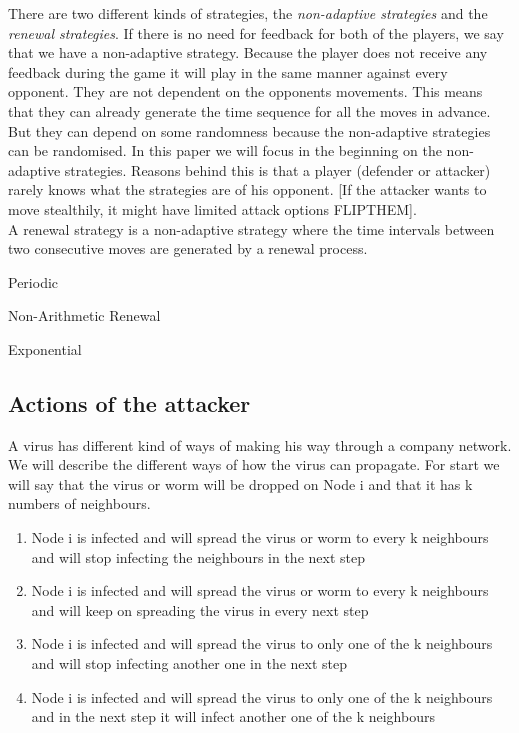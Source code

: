 There are two different kinds of strategies, the \textit{non-adaptive strategies} and the \textit{renewal strategies}. If there is no need for feedback for both of the players, we say that we have a non-adaptive strategy. Because the player does not receive any feedback during the game it will play in the same manner against every opponent. They are not dependent on the opponents movements. This means that they can already generate the time sequence for all the moves in advance.  But they can depend on some randomness because the non-adaptive strategies can be randomised. 
In this paper we will focus in the beginning on the non-adaptive strategies. Reasons behind this is that a player (defender or attacker) rarely knows what the strategies are of his opponent. [If the attacker wants to move stealthily, it might have limited attack options FLIPTHEM]. \\
A renewal strategy is a non-adaptive strategy where the time intervals between two consecutive moves are generated by a renewal process. \\

 \begin{description}
 \item Periodic
 \item Non-Arithmetic Renewal
 \item Exponential
 \end{description}
 
 \subsection{Actions of the attacker}
A virus has different kind of ways of making his way through a company network. We will describe the different ways of how the virus can propagate. For start we will say that the virus or worm will be dropped on Node i and that it has k numbers of neighbours. 
\begin{enumerate}
\item Node i is infected and will spread the virus or worm to every k neighbours and will stop infecting the neighbours in the next step
\item Node i is infected and will spread the virus or worm to every k neighbours and will keep on spreading the virus in every next step
\item Node i is infected and will spread the virus to only one of the k neighbours and will stop infecting another one in the next step
\item Node i is infected and will spread the virus to only one of the k neighbours and in the next step it will infect another one of the k neighbours 
\end{enumerate}

